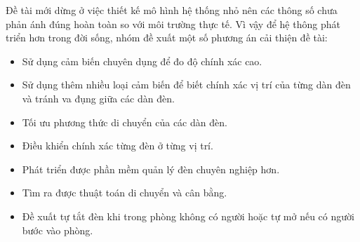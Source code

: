 Đề tài mới dừng ở việc thiết kế mô hình hệ thống nhỏ nên các thông số chưa phản ánh đúng hoàn toàn so với môi trường thực tế. Vì vậy để hệ thông phát triển hơn trong đời sống, nhóm đề xuất một số phương án cải thiện đề tài:
\begin{itemize}
\item Sử dụng cảm biến chuyên dụng để đo độ chính xác cao.
\item Sử dụng thêm nhiều loại cảm biến để biết chính xác vị trí của từng dàn đèn và tránh va đụng giữa các dàn đèn.
\item Tối ưu phương thức di chuyển của các dàn đèn.
\item Điều khiển chính xác từng đèn ở từng vị trí.
\item Phát triển được phần mềm quản  lý đèn chuyên nghiệp hơn.
\item Tìm ra được thuật toán di chuyển và cân bằng.
\item Đề xuất tự tắt đèn khi trong phòng không có người hoặc tự mở nếu có người bước vào phòng.
\end{itemize}
